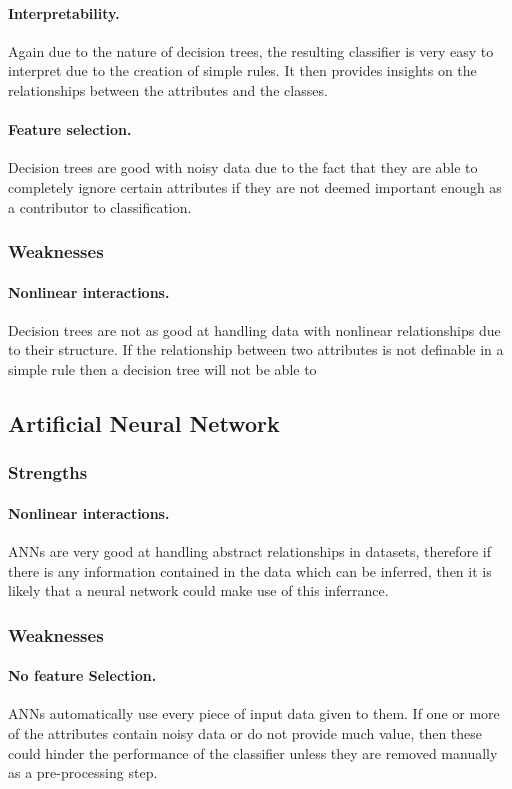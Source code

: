 \documentclass[12pt]{article}
\begin{document}
      \paragraph{Interpretability.}
        Again due to the nature of decision trees, the resulting classifier is very easy to interpret due to the creation of simple rules. It then provides insights on the relationships between the attributes and the classes.
      \paragraph{Feature selection.}
        Decision trees are good with noisy data due to the fact that they are able to completely ignore certain attributes if they are not deemed important enough as a contributor to classification.

    \subsubsection{Weaknesses}
      \paragraph{Nonlinear interactions.}
        Decision trees are not as good at handling data with nonlinear relationships due to their structure. If the relationship between two attributes is not definable in a simple rule then a decision tree will not be able to

  \subsection{Artificial Neural Network}
    \subsubsection{Strengths}
      \paragraph{Nonlinear interactions.}
        ANNs are very good at handling abstract relationships in datasets, therefore if there is any information contained in the data which can be inferred, then it is likely that a neural network could make use of this inferrance.

    \subsubsection{Weaknesses}
      \paragraph{No feature Selection.}
        ANNs automatically use every piece of input data given to them. If one or more of the attributes contain noisy data or do not provide much value, then these could hinder the performance of the classifier unless they are removed manually as a pre-processing step.
\end{document}
